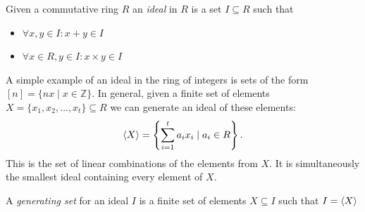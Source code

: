 \documentclass{article}
\theoremstyle{changedot}
\theoremstyle{changedotbreak}
\theoremstyle{nonumberplain}
\DeclarePairedDelimiter{\tuple}{\langle}{\rangle}
\newcommand{\m}{\mathbb}
\begin{document}
\begin{definition}[Ideal]
  Given a commutative ring $R$ an \emph{ideal} in $R$ is a set $I \subseteq R$ such that
  \begin{itemize}
      \item $\forall x, y \in I: x + y \in I$
      \item $\forall x \in R, y \in I: x \times y \in I$
  \end{itemize}
\end{definition}

A simple example of an ideal in the ring of integers is sets of the form $[n] = \{nx \mid x \in \m Z\}$. In general, given a finite set of elements $X = \{x_{1}, x_{2}, \dots, x_{t}\} \subseteq R$ we can generate an ideal of these elements: \[\tuple X = \left\{\sum_{i = 1}^{t} a_{i} x_{i} \mid a_{i} \in R\right\}.\] This is the set of linear combinations of the elements from $X$. It is simultaneously the smallest ideal containing every element of $X$.

\begin{definition}
  A \emph{generating set} for an ideal $I$ is a finite set of elements $X \subseteq I$ such that $I = \tuple X$
\end{definition}
\end{document}
